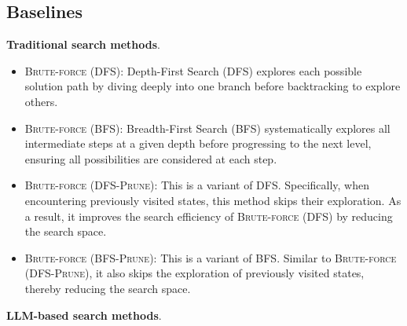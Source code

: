 \subsection{Baselines}
\label{appendix:baselines} 
\textbf{Traditional search methods}. 
\begin{itemize}[leftmargin=*]
    \item \textsc{Brute-force (DFS)}: Depth-First Search (DFS) explores each possible solution path by diving deeply into one branch before backtracking to explore others.
    \item \textsc{Brute-force (BFS)}: Breadth-First Search (BFS) systematically explores all intermediate steps at a given depth before progressing to the next level, ensuring all possibilities are considered at each step.
    \item \textsc{Brute-force (DFS-Prune)}: This is a variant of \textsc{DFS}. Specifically, when encountering previously visited states, this method skips their exploration. As a result, it improves the search efficiency of \textsc{Brute-force (DFS)} by reducing the search space.
    \item \textsc{Brute-force (BFS-Prune)}: This is a variant of \textsc{BFS}. Similar to \textsc{Brute-force (DFS-Prune)}, it also skips the exploration of previously visited states, thereby reducing the search space.
\end{itemize}
\textbf{LLM-based search methods}.
